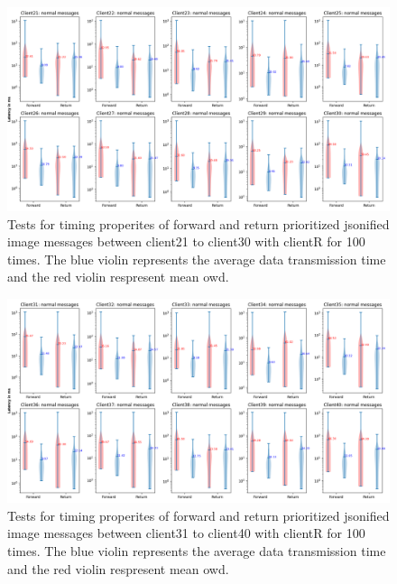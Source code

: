 \begin{figure}
    \includegraphics[width=\textheight]{figures/appendix/priority_tests/log_violin_50clients_image_figure_3.png}\hfill 
    \caption{Tests for timing properites of forward and return prioritized jsonified image messages between client21 to client30 
    with clientR for 100 times. The blue violin represents the average data transmission time and the red violin 
    respresent mean \gls{owd}.} \label{fig: priority-50clients-image-c}
\end{figure}

\begin{figure}
    \includegraphics[width=\textheight]{figures/appendix/priority_tests/log_violin_50clients_image_figure_4.png}\hfill 
    \caption{Tests for timing properites of forward and return prioritized jsonified image messages between client31 to client40 
    with clientR for 100 times. The blue violin represents the average data transmission time and the red violin 
    respresent mean \gls{owd}.} \label{fig: priority-50clients-image-d}
\end{figure}

